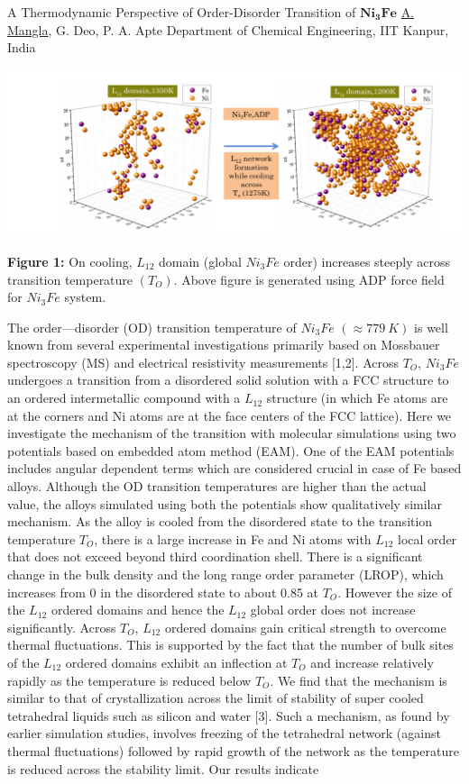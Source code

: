 
    \begin{abstract_online}{A Thermodynamic Perspective of Order-Disorder Transition of $\mathbf{Ni_3Fe}$ }{%
        \underline{A. Mangla}, G. Deo, P. A. Apte}{%
        }{%
        Department of Chemical Engineering, IIT Kanpur, India}
    \begin{center}  \includegraphics[width=\linewidth]{abstracts/txt/figures/anil.png}  \caption{\textbf{Figure 1:} On cooling, $L_{12}$ domain (global $Ni_3Fe$ order) increases steeply across transition temperature $(T_O)$. Above figure is generated using ADP force field for $Ni_3Fe$ system.}  \end{center} The order—disorder (OD) transition temperature of $Ni_3Fe$ $(\approx 779 \ K)$ is well known from several experimental investigations primarily based on Mossbauer spectroscopy (MS) and electrical resistivity measurements [1,2]. Across $T_O$, $Ni_3Fe$ undergoes a transition from a disordered solid solution with a FCC structure to an ordered intermetallic compound with a $L_{12}$ structure (in which Fe atoms are at the corners and Ni atoms are at the face centers of the FCC lattice).  Here we investigate the mechanism of the transition with molecular simulations using two potentials based on embedded atom method (EAM).  One of the EAM potentials includes angular dependent terms which are considered crucial in case of Fe based alloys.  Although the OD transition temperatures are higher than the actual value, the alloys simulated using both the potentials show qualitatively similar mechanism.   As the alloy is cooled from the disordered state to the transition temperature $T_O$, there is a large increase in Fe and Ni atoms with $L_{12}$ local order that does not exceed beyond third coordination shell. There is a significant change in the bulk density and the long range order parameter (LROP), which increases from 0 in the disordered state to about 0.85 at $T_O$.  However the size of the $L_{12}$ ordered domains and hence the $L_{12}$ global order does not increase significantly.  Across $T_O$, $L_{12}$ ordered domains gain critical strength to overcome thermal fluctuations.   This is supported by the fact that the number of bulk sites of the $L_{12}$ ordered domains exhibit an inflection at $T_O$ and increase relatively rapidly as the temperature is reduced below $T_O$.  We find that the mechanism is similar to that of crystallization across the limit of stability of super cooled tetrahedral liquids such as silicon and water [3]. Such a mechanism, as found by earlier simulation studies, involves freezing of the tetrahedral network (against thermal fluctuations) followed by rapid growth of the network as the temperature is reduced across the stability limit.  Our results indicate 
\end{abstract_online}
